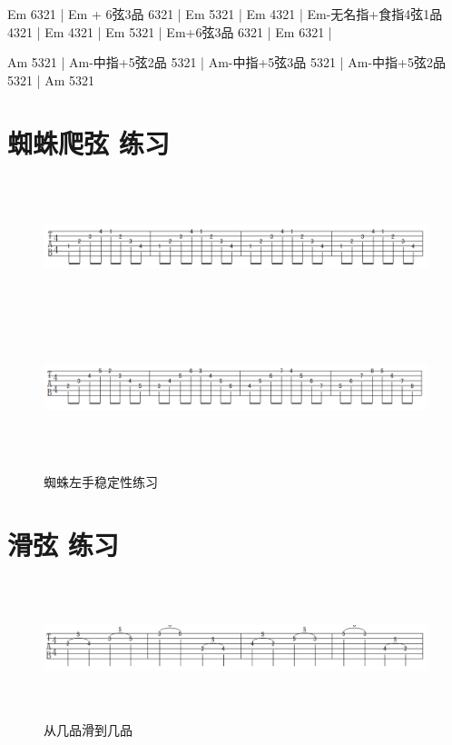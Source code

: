 \documentclass[UTF8,a4paper,12pt]{ctexbook}
\begin{document}
		Em 6321 | Em + 6弦3品 6321 | Em 5321 | Em 4321 | Em-无名指+食指4弦1品 4321 | Em 4321 | Em 5321 | Em+6弦3品 6321 | Em 6321 |
		
		 Am 5321 | Am-中指+5弦2品 5321 | Am-中指+5弦3品 5321 | Am-中指+5弦2品 5321 | Am 5321
	
	
	\section{蜘蛛爬弦 练习}
		\begin{figure}[H]
			\centering
			\includegraphics[width=17cm,height=4cm]{zhizhu}
			\includegraphics[width=17cm,height=4cm]{zhizhu2}
			\caption{蜘蛛左手稳定性练习}
		\end{figure}
		
	
	
	\section{滑弦 练习}
		
		\begin{figure}[H]
			\centering
			\includegraphics[width=17cm,height=4cm]{huaxian}
			\caption{从几品滑到几品}
		\end{figure}
	
	
	
\end{document}
